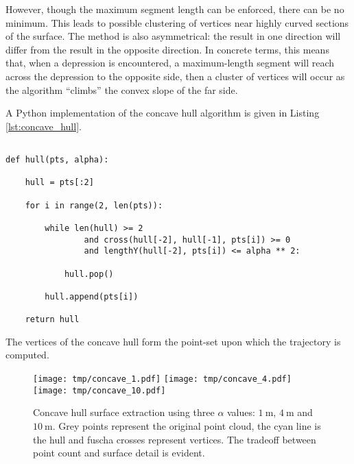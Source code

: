 \documentclass[doc]{apa6}
\begin{document}
However, though the maximum segment length can be enforced, there can be no minimum. This leads to possible clustering of vertices near highly curved sections of the surface. The method is also asymmetrical: the result in one direction will differ from the result in the opposite direction. In concrete terms, this means that, when a depression is encountered, a maximum-length segment will reach across the depression to the opposite side, then a cluster of vertices will occur as the algorithm ``climbs'' the convex slope of the far side.

A Python implementation of the concave hull algorithm is given in Listing \ref{lst:concave_hull}.

\begin{listing}
\begin{verbatim}

def hull(pts, alpha):

	hull = pts[:2]

	for i in range(2, len(pts)):
	
		while len(hull) >= 2 
				and cross(hull[-2], hull[-1], pts[i]) >= 0 
				and lengthY(hull[-2], pts[i]) <= alpha ** 2:

			hull.pop()

		hull.append(pts[i])

	return hull

\end{verbatim}
\caption{Modified Monotone Chain algorithm for constructing a convex hull. The \lstinline{cross} function determines whether the segment makes a clockwise or counterclockwise turn; \lstinline{lengthY} gives the distance between points in $y$. The \lstinline{pts} array is a list of points, sorted on $y$; \lstinline{alpha} is the maximum segment length.}
\label{lst:concave_hull}
\end{listing}

The vertices of the concave hull form the point-set upon which the trajectory is computed.

\begin{figure} %
\texttt{[image: tmp/concave\_1.pdf]} 
\texttt{[image: tmp/concave\_4.pdf]} 
\texttt{[image: tmp/concave\_10.pdf]} 
\caption{Concave hull surface extraction using three $\alpha$ values: $\SI{1}\m$, $\SI{4}\m$ and $\SI{10}\m$. Grey points represent the original point cloud, the cyan line is the hull and fuscha crosses represent vertices. The tradeoff between point count and surface detail is evident.}
\label{fig:concave}
\end{figure}
\end{document}
